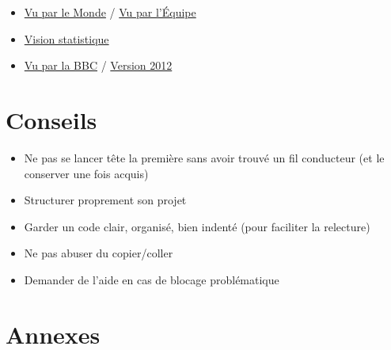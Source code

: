\documentclass{article}
\begin{document}
\begin{itemize}

\item
\href{https://www.lemonde.fr/les-decodeurs/article/2018/02/26/jo-2018-et-si-on-revoyait-le-classement_5262807_4355770.html}{Vu par le Monde}
/
\href{http://www.wedodata.fr/equipe-jo2016.php}{Vu par l'Équipe}

\item
\href{https://www.statista.com/topics/1730/olympic-summer-games/}{Vision statistique}

\item

\href{https://www.bbc.com/sport/olympics/37148372}{Vu par la BBC}
/
\href{https://www.theguardian.com/commentisfree/2012/aug/03/london-2012-olympics-open-data}{Version 2012}

\end{itemize}

\section{Conseils}

\begin{itemize}

\item Ne pas se lancer tête la première sans avoir trouvé un fil conducteur (et le conserver une fois acquis)

\item Structurer proprement son projet

\item Garder un code clair, organisé, bien indenté (pour faciliter la relecture)

\item Ne pas abuser du copier/coller

\item Demander de l'aide en cas de blocage problématique

\end{itemize}

\newpage

\section{Annexes}
\end{document}
